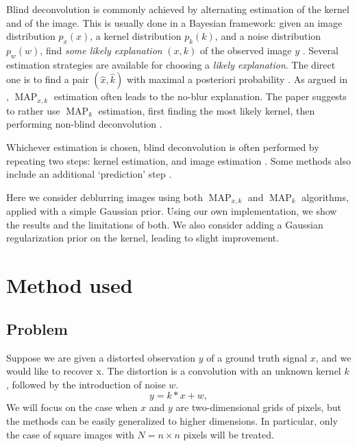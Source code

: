 \documentclass[english,a4paper]{article}
\theoremstyle{plain}
\theoremstyle{definition}
\theoremstyle{remark}
\DeclareMathOperator{\MAP}{MAP}
\begin{document}
Blind deconvolution is commonly achieved by alternating estimation of the kernel and of the image.
This is usually done in a Bayesian framework: given an image distribution $p_x(x)$, a kernel distribution $p_k(k)$, and a noise distribution $p_w(w)$, find \emph{some likely explanation} $(x,k)$ of the observed image $y$ \cite{levin2009understanding,levin2011efficient}.
Several estimation strategies are available for choosing a \emph{likely explanation}. The direct one is to find a pair $(\hat{x},\hat{k})$ with maximal a posteriori probability \cite{cho2009fast,cho2007removing,jia2007single,shan2008high,xu2010two}.
As argued in \cite{levin2011efficient,levin2009understanding}, $\MAP_{x,k}$ estimation often leads to the no-blur explanation. The paper suggests to rather use $\MAP_k$ estimation, first finding the most likely kernel, then performing non-blind deconvolution \cite{fergus2006removing,whyte2012non}.

Whichever estimation is chosen, blind deconvolution is often performed by repeating two steps: kernel estimation, and image estimation \cite{jia2007single,fergus2006removing,levin2009understanding,levin2011efficient,shan2008high}. Some methods also include an additional `prediction' step \cite{cho2009fast}.

Here we consider deblurring images using both $\MAP_{x,k}$ and $\MAP_k$ algorithms, applied with a simple Gaussian prior. Using our own implementation, we show the results and the limitations of both. We also consider adding a Gaussian regularization prior on the kernel, leading to slight improvement.



\section{Method used}

\subsection{Problem}
Suppose we are given a distorted observation $y$ of a ground truth signal $x$, and we would like to recover x. The distortion is a convolution with an unknown kernel $k$, followed by the introduction of noise $w$.
\begin{equation}\label{eq:convolution}
y = k*x + w ,
\end{equation}
We will focus on the case when $x$ and $y$ are two-dimensional grids of pixels, but the methods can be easily generalized to higher dimensions. In particular, only the case of square images with $N = n\times n$ pixels will be treated.
\end{document}
